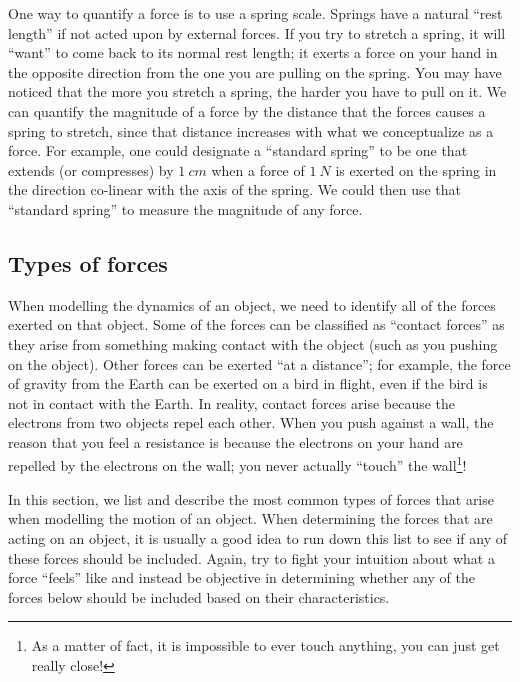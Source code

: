 One way to quantify a force is to use a spring scale. Springs have a natural ``rest length'' if not acted upon by external forces. If you try to stretch a spring, it will ``want'' to come back to its normal rest length; it exerts a force on your hand in the opposite direction from the one you are pulling on the spring. You may have noticed that the more you stretch a spring, the harder you have to pull on it. We can quantify the magnitude of a force by the distance that the forces causes a spring to stretch, since that distance increases with what we conceptualize as a force. For example, one could designate a ``standard spring'' to be one that extends (or compresses) by $\SI{1}{cm}$ when a force of $\SI{1}{N}$ is exerted on the spring in the direction co-linear with the axis of the spring. We could then use that ``standard spring'' to measure the magnitude of any force.

\subsection{Types of forces}
\label{sec:newtonslaws:typesofforces}
When modelling the dynamics of an object, we need to identify all of the forces exerted on that object. Some of the forces can be classified as ``contact forces'' as they arise from something making contact with the object (such as you pushing on the object). Other forces can be exerted ``at a distance''; for example, the force of gravity from the Earth can be exerted on a bird in flight, even if the bird is not in contact with the Earth. In reality, contact forces arise because the electrons from two objects repel each other. When you push against a wall, the reason that you feel a resistance is because the electrons on your hand are repelled by the electrons on the wall; you never actually ``touch'' the wall\footnote{As a matter of fact, it is impossible to ever touch anything, you can just get really close!}!

In this section, we list and describe the most common types of forces that arise when modelling the motion of an object. When determining the forces that are acting on an object, it is usually a good idea to run down this list to see if any of these forces should be included. Again, try to fight your intuition about what a force ``feels'' like and instead be objective in determining whether any of the forces below should be included based on their characteristics.

